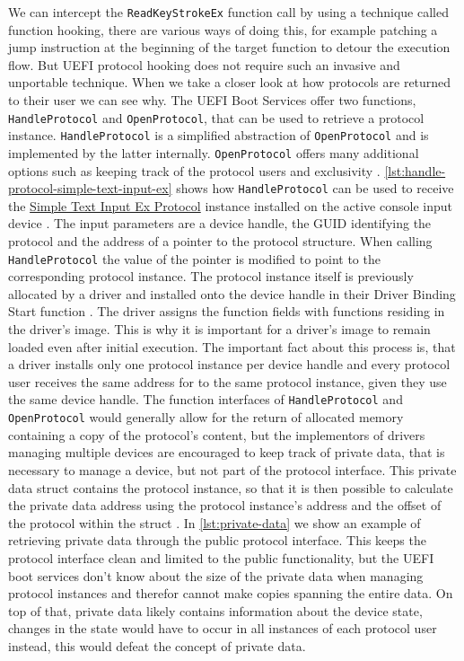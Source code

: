 We can intercept the \lstinline{ReadKeyStrokeEx} function call by using a technique called function hooking, there are various ways of doing this, for example patching a jump instruction at the beginning of the target function to detour the execution flow.
But \ac{UEFI} protocol hooking does not require such an invasive and unportable technique.
When we take a closer look at how protocols are returned to their user we can see why.
The \ac{UEFI} Boot Services offer two functions, \lstinline{HandleProtocol} and \lstinline{OpenProtocol}, that can be used to retrieve a protocol instance. \lstinline{HandleProtocol} is a simplified abstraction of \lstinline{OpenProtocol} and is implemented by the latter internally.
\lstinline{OpenProtocol} offers many additional options such as keeping track of the protocol users and exclusivity \cite[Section 7.3]{uefi-spec}.
\autoref{lst:handle-protocol-simple-text-input-ex} shows how \lstinline{HandleProtocol} can be used to receive the \hyperref[lst:simple-text-input-ex-protocol]{Simple Text Input Ex Protocol} instance installed on the active console input device \cite[Section 4.3]{uefi-spec}.
The input parameters are a device handle, the \ac{GUID} identifying the protocol and the address of a pointer to the protocol structure.
When calling \lstinline{HandleProtocol} the value of the pointer is modified to point to the corresponding protocol instance.
The protocol instance itself is previously allocated by a driver and installed onto the device handle in their Driver Binding Start function .
The driver assigns the function fields with functions residing in the driver's image.
This is why it is important for a driver's image to remain loaded even after initial execution.
The important fact about this process is, that a driver installs only one protocol instance per device handle and every protocol user receives the same address for to the same protocol instance, given they use the same device handle.
The function interfaces of \lstinline{HandleProtocol} and \lstinline{OpenProtocol} would generally allow for the return of allocated memory containing a copy of the protocol's content, but the implementors of drivers managing multiple devices are encouraged to keep track of private data, that is necessary to manage a device, but not part of the protocol interface.
This private data struct contains the protocol instance, so that it is then possible to calculate the private data address using the protocol instance's address and the offset of the protocol within the struct \cite[Section 8]{tianocore-edk2-driver-writer-s-guide}.
In \autoref{lst:private-data} we show an example of retrieving private data through the public protocol interface.
This keeps the protocol interface clean and limited to the public functionality, but the \ac{UEFI} boot services don't know about the size of the private data when managing protocol instances and therefor cannot make copies spanning the entire data.
On top of that, private data likely contains information about the device state, changes in the state would have to occur in all instances of each protocol user instead, this would defeat the concept of private data.

